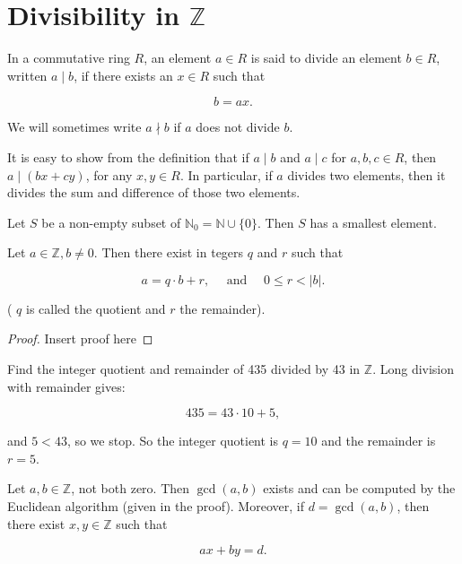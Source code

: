 \section{Divisibility in \(\mathbb{Z}\)}

\begin{definition}[Division]
  In a commutative ring \(R\), an element \(a \in R\) is said to divide an element \(b \in R\), written \(a \mid b\), if there exists an \(x \in R\) such that

\[
b=a x .
\]

We will sometimes write \(a \nmid b\) if \(a\) does not divide \(b\).
\end{definition}

\begin{remark}
  It is easy to show from the definition that if \(a \mid b\) and \(a \mid c\) for \(a, b, c \in R\), then \(a \mid(b x+c y)\), for any \(x, y \in R\). In particular, if \(a\) divides two elements, then it divides the sum and difference of those two elements.
\end{remark}

\begin{lemma}
  Let \(S\) be a non-empty subset of \(\mathbb{N}_0=\mathbb{N} \cup\{0\}\). Then \(S\) has a smallest element.
\end{lemma}

\begin{proposition}
  Let \(a \in \mathbb{Z}, b \neq 0\). Then there exist in tegers \(q\) and \(r\) such that

\[
a=q \cdot b+r, \quad \text { and } \quad 0 \leq r<|b| .
\]

( \(q\) is called the quotient and \(r\) the remainder).
\end{proposition}

\begin{proof}
  Insert proof here
\end{proof}

\begin{example}
  Find the integer quotient and remainder of 435 divided by 43 in \(\mathbb{Z}\). Long division with remainder gives:

\[
435=43 \cdot 10+5,
\]

and \(5<43\), so we stop. So the integer quotient is \(q=10\) and the remainder is \(r=5\).
\end{example}

\begin{theorem}
  Let \(a, b \in \mathbb{Z}\), not both zero. Then \(\operatorname{gcd}(a, b)\) exists and can be computed by the Euclidean algorithm (given in the proof). Moreover, if \(d=\operatorname{gcd}(a, b)\), then there exist \(x, y \in \mathbb{Z}\) such that

\[
a x+b y=d .
\]
\end{theorem}

